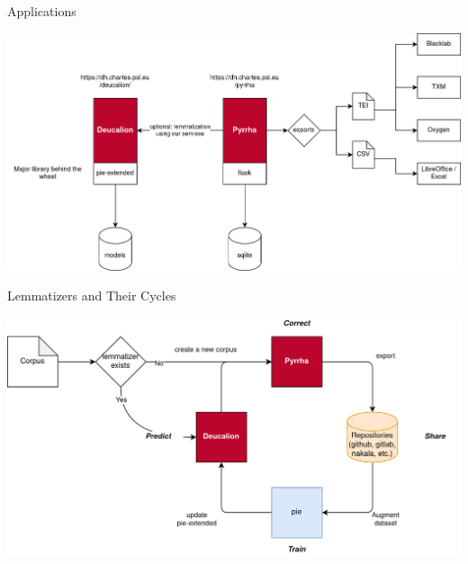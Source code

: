 \documentclass[aspectratio=169]{beamer}
\begin{document}
\begin{frame}{Applications}

\begin{center}
    \includegraphics[width=\linewidth,height=0.8\textheight,keepaspectratio]{nlp-for-ch/images/infra-applis.png}
\end{center}
    
\end{frame}

\begin{frame}{Lemmatizers and Their Cycles}

\begin{center}
    \includegraphics[width=\linewidth,height=0.8\textheight,keepaspectratio]{nlp-for-ch/images/infra-cycle.png}
\end{center}

\end{frame}
\end{document}
